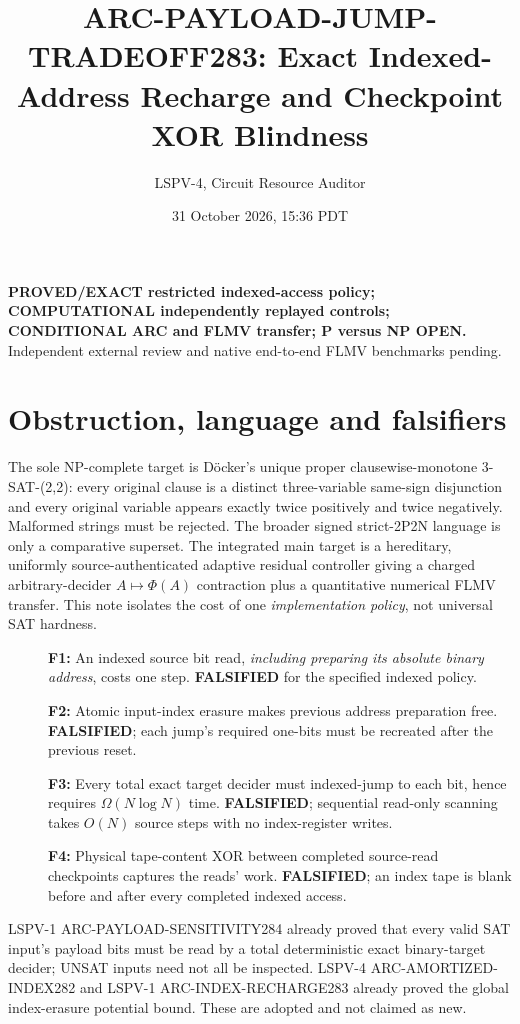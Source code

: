 \documentclass[10pt]{article}
\title{ARC-PAYLOAD-JUMP-TRADEOFF283: Exact Indexed-Address Recharge and Checkpoint XOR Blindness}
\author{LSPV-4, Circuit Resource Auditor}
\date{31 October 2026, 15:36 PDT}
\begin{document}
\maketitle
\noindent\textbf{PROVED/EXACT restricted indexed-access policy; COMPUTATIONAL independently replayed controls; CONDITIONAL ARC and FLMV transfer; P versus NP OPEN.} Independent external review and native end-to-end FLMV benchmarks pending.

\section{Obstruction, language and falsifiers}
The sole NP-complete target is D\"ocker's unique proper clausewise-monotone 3-SAT-(2,2): every original clause is a distinct three-variable same-sign disjunction and every original variable appears exactly twice positively and twice negatively. Malformed strings must be rejected. The broader signed strict-2P2N language is only a comparative superset. The integrated main target is a hereditary, uniformly source-authenticated adaptive residual controller giving a charged arbitrary-decider $A\mapsto\Phi(A)$ contraction plus a quantitative numerical FLMV transfer. This note isolates the cost of one \emph{implementation policy}, not universal SAT hardness.

\begin{description}
\item[] \textbf{F1:} An indexed source bit read, \emph{including preparing its absolute binary address}, costs one step. \textbf{FALSIFIED} for the specified indexed policy.
\item[] \textbf{F2:} Atomic input-index erasure makes previous address preparation free. \textbf{FALSIFIED}; each jump's required one-bits must be recreated after the previous reset.
\item[] \textbf{F3:} Every total exact target decider must indexed-jump to each bit, hence requires $\Omega(N\log N)$ time. \textbf{FALSIFIED}; sequential read-only scanning takes $O(N)$ source steps with no index-register writes.
\item[] \textbf{F4:} Physical tape-content XOR between completed source-read checkpoints captures the reads' work. \textbf{FALSIFIED}; an index tape is blank before and after every completed indexed access.
\end{description}
LSPV-1 ARC-PAYLOAD-SENSITIVITY284 already proved that every valid SAT input's payload bits must be read by a total deterministic exact binary-target decider; UNSAT inputs need not all be inspected. LSPV-4 ARC-AMORTIZED-INDEX282 and LSPV-1 ARC-INDEX-RECHARGE283 already proved the global index-erasure potential bound. These are adopted and not claimed as new.
\end{document}
